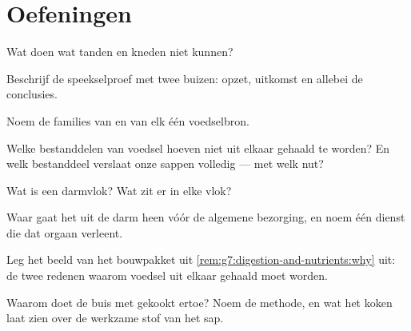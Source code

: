 \section{Oefeningen}

\begin{exercise}[$\star$]\label{exo:g7:digestion-and-nutrients:1}
Wat doen  wat tanden en kneden niet kunnen?
\end{exercise}

\begin{exercise}[$\star$]\label{exo:g7:digestion-and-nutrients:2}
Beschrijf de speekselproef met twee buizen: opzet, uitkomst en allebei de
conclusies.
\end{exercise}

\begin{exercise}[$\star$]\label{exo:g7:digestion-and-nutrients:3}
Noem de families van  en van elk één voedselbron.
\end{exercise}

\begin{exercise}[$\star$]\label{exo:g7:digestion-and-nutrients:4}
Welke bestanddelen van voedsel hoeven niet uit elkaar gehaald te worden?
En welk bestanddeel verslaat onze sappen volledig --- met welk nut?
\end{exercise}

\begin{exercise}[$\star$]\label{exo:g7:digestion-and-nutrients:5}
Wat is een darmvlok? Wat zit er in elke vlok?
\end{exercise}

\begin{exercise}[$\star$]\label{exo:g7:digestion-and-nutrients:6}
Waar gaat het  uit de darm heen vóór de algemene bezorging, en noem
één dienst die dat orgaan verleent.
\end{exercise}

\begin{exercise}[$\star\star$]\label{exo:g7:digestion-and-nutrients:7}
Leg het beeld van het bouwpakket uit
\cref{rem:g7:digestion-and-nutrients:why} uit: de twee redenen waarom
voedsel uit elkaar gehaald moet worden.
\end{exercise}

\begin{exercise}[$\star\star$]\label{exo:g7:digestion-and-nutrients:8}
Waarom doet de buis met gekookt  ertoe? Noem de methode, en wat
het koken laat zien over de werkzame stof van het sap.
\end{exercise}

